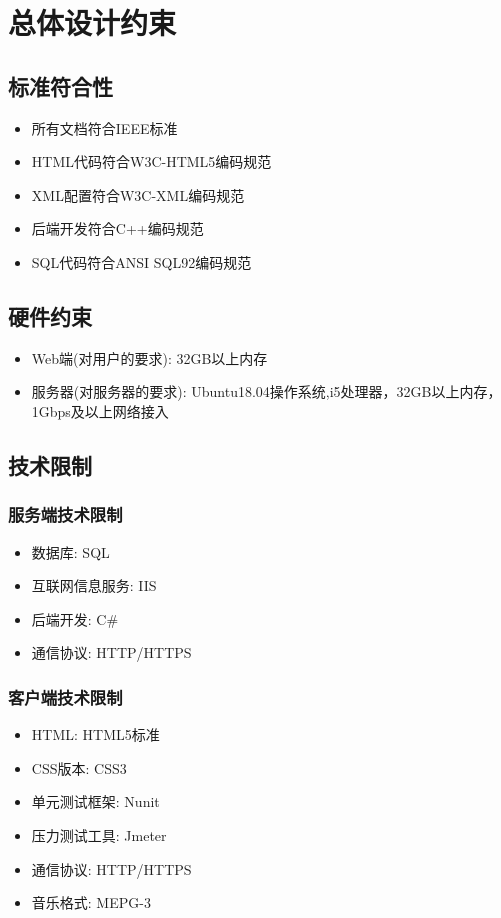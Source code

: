 \chapter{总体设计约束}

\section{标准符合性}


\begin{itemize}
	\item 所有文档符合IEEE标准
	\item HTML代码符合W3C-HTML5编码规范
	\item XML配置符合W3C-XML编码规范
	\item 后端开发符合C++编码规范
	\item SQL代码符合ANSI SQL92编码规范
\end{itemize}


\section{硬件约束}


\begin{itemize}
	\item Web端(对用户的要求): 32GB以上内存
	\item 服务器(对服务器的要求): Ubuntu18.04操作系统,i5处理器，32GB以上内存，1Gbps及以上网络接入
\end{itemize}


\section{技术限制}

\subsection{服务端技术限制}

\begin{itemize}
	\item 数据库: SQL
	\item 互联网信息服务: IIS
	\item 后端开发: C\#
	\item 通信协议: HTTP/HTTPS
\end{itemize}


\subsection{客户端技术限制}

\begin{itemize}
	\item HTML: HTML5标准
	\item CSS版本: CSS3
	\item 单元测试框架: Nunit
	\item 压力测试工具: Jmeter
	\item 通信协议: HTTP/HTTPS
	\item 音乐格式: MEPG-3
\end{itemize}
